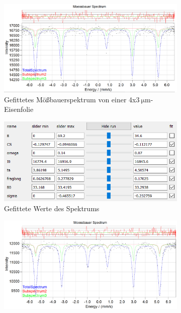 \documentclass[german, %
parskip=full, %
bibliography=totoc, %
]{scrartcl}
\begin{document}
\begin{figure}[ht]
	\centering
	\begin{subfigure}[b]{0.5\textwidth}
		\includegraphics[width=\textwidth]{MoessbauerEisen4x3}
	  \caption{Gefittetes Mößbauerspektrum von einer 4x\(\SI{3}{\micro\meter}\)-Eisenfolie}
	  \label{fig:moess4x3}
  \end{subfigure}
  \begin{subfigure}[b]{0.4\textwidth}
	  \includegraphics[width=\textwidth]{WerteEisen4x3}
	  \caption{Gefittete Werte des Spektrums}
	  \label{fig:werte4x3}
  \end{subfigure}
	\begin{subfigure}[b]{0.5\textwidth}
		\includegraphics[width=\textwidth]{MoessbauerEisen25}

\end{subfigure}
\end{figure}
\end{document}
